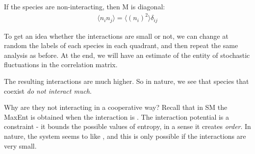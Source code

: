\documentclass[../../main.tex]{subfiles}
\begin{document}
\medskip

If the species are non-interacting, then $\mathrm{M}$ is diagonal:
\begin{align*}
    \langle n_i n_j \rangle = \langle (n_i)^2 \rangle \delta_{ij}
\end{align*}


To get an idea whether the interactions are small or not, we can change at random the labels of each species in each quadrant, and then repeat the same analysis as before. At the end, we will have an estimate of the entity of stochastic fluctuations in the correlation matrix. 


The resulting interactions are much higher. So in nature, we see that species that coexist \textit{do not interact much}. 

Why are they not interacting in a cooperative way? Recall that in SM the MaxEnt is obtained when the interaction is . The interaction potential is a constraint - it bounds the possible values of entropy, in a sense it creates \textit{order}. In nature, the system seems to like , and this is only possible if the interactions are very small.
\end{document}
